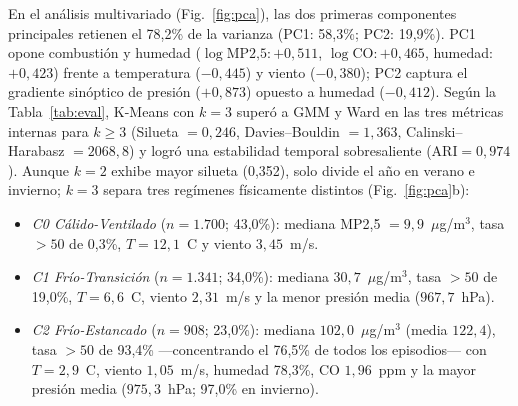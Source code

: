 \documentclass[conference]{IEEEtran}
\begin{document}
En el an{\'a}lisis multivariado (Fig.~\ref{fig:pca}), las dos primeras componentes principales retienen el 78,2\% de la varianza (PC1: 58,3\%; PC2: 19,9\%). PC1 opone combusti{\'o}n y humedad ($\log\text{MP2,5}: +0,511$, $\log\text{CO}: +0,465$, humedad: $+0,423$) frente a temperatura ($-0,445$) y viento ($-0,380$); PC2 captura el gradiente sin{\'o}ptico de presi{\'o}n ($+0,873$) opuesto a humedad ($-0,412$). Seg{\'u}n la Tabla~\ref{tab:eval}, K-Means con $k=3$ super{\'o} a GMM y Ward en las tres m{\'e}tricas internas para $k\geq 3$ (Silueta $=0,246$, Davies--Bouldin $=1,363$, Calinski--Harabasz $=2068{,}8$) y logr{\'o} una estabilidad temporal sobresaliente ($\text{ARI}=0,974$). Aunque $k=2$ exhibe mayor silueta (0,352), solo divide el a{\~n}o en verano e invierno; $k=3$ separa tres reg{\'i}menes f{\'i}sicamente distintos (Fig.~\ref{fig:pca}b):
\begin{itemize}
\item \textit{C0 C{\'a}lido-Ventilado} ($n=1.700$; 43,0\%): mediana MP2,5 $=9{,}9$~$\mu$g/m$^3$, tasa $>50$ de 0,3\%, $T=12{,}1$~\textdegree C y viento $3{,}45$~m/s.
\item \textit{C1 Fr{\'i}o-Transici{\'o}n} ($n=1.341$; 34,0\%): mediana $30{,}7$~$\mu$g/m$^3$, tasa $>50$ de 19,0\%, $T=6{,}6$~\textdegree C, viento $2{,}31$~m/s y la menor presi{\'o}n media ($967{,}7$~hPa).
\item \textit{C2 Fr{\'i}o-Estancado} ($n=908$; 23,0\%): mediana $102{,}0$~$\mu$g/m$^3$ (media $122{,}4$), tasa $>50$ de 93,4\% ---concentrando el 76,5\% de todos los episodios--- con $T=2{,}9$~\textdegree C, viento $1{,}05$~m/s, humedad 78,3\%, CO $1{,}96$~ppm y la mayor presi{\'o}n media ($975{,}3$~hPa; 97,0\% en invierno).
\end{itemize}
\end{document}
